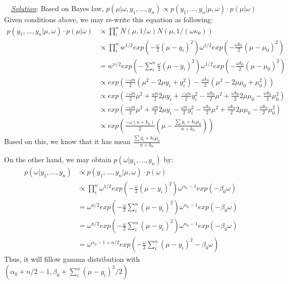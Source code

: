 \documentclass[twoside]{article}
\newenvironment{solution}{
  \begin{flushleft} \noindent ~~\underline{\emph{Solution}}: \rmfamily}{\end{flushleft}}
\begin{document}
\begin{solution}
Based on Bayes law, $p(\mu |\omega, y_1,\dots, y_n) \propto p(y_1, \dots, y_n| \mu, \omega) \cdot p(\mu| \omega)  $ Given conditions above, we may re-write this equation as following:
\begin{equation}
\begin{split}
p(y_1, \dots, y_n| \mu, \omega) \cdot p(\mu| \omega) &\propto \prod_i^n N(\mu, 1/\omega) N(\mu, 1/(\omega \kappa_0))
\\ &\propto \prod_i^nw^{1/2}exp(-\frac{\omega}{2}(\mu-y_i)^2) \omega^{1/2}exp(-\frac{\omega k_0}{2}(\mu-\mu_0)^2)
\\ &= w^{n/2}exp(-\sum_i^n\frac{\omega}{2}(\mu-y_i)^2) \omega^{1/2} exp(-\frac{\omega k_0}{2}(\mu-\mu_0)^2) 
\\ & \propto exp(\frac{-\omega n}{2}(\mu^2 - 2\mu y_i + y_i^2) -\frac{\omega k_0}{2}(\mu^2-2\mu\mu_0+\mu_0^2))
\\ & \propto exp(\frac{-\omega n}{2}\mu^2 + \frac{\omega n}{2}2\mu y_i + \frac{-\omega n}{2}y_i^2 -\frac{\omega k_0}{2}\mu^2+\frac{\omega k_0}{2}2\mu\mu_0-\frac{\omega k_0}{2}\mu_0^2)
\\ & \propto exp(\frac{-\omega n}{2}\mu^2 + \frac{\omega n}{2}2\mu y_i - \frac{\omega n}{2}y_i^2 -\frac{\omega k_0}{2}\mu^2+\frac{\omega k_0}{2}2\mu\mu_0-\frac{\omega k_0}{2}\mu_0^2)
\\ & \propto exp(\frac{-\omega(n +k_0)}{2}(\mu-\frac{\sum y_i + k_0\mu_0}{n+k_0}))
\end{split}
\end{equation}
Based on this, we know that it has mean $\frac{\sum y_i + k_0\mu_0}{n+k_0}$
\par
On the other hand, we may obtain $p(\omega|y_1,\dots,y_n)$ by:
\begin{equation}
\begin{split}
p(\omega|y_1,\dots,y_n) & \propto p(y_1, \dots, y_n|\mu, \omega) \cdot p(\omega)
\\ & \propto \prod_i^n\omega^{1/2}exp(-\frac{\omega}{2}(\mu-y_i)^2) \omega^{\alpha_0-1}exp(-\beta_0\omega) 
\\ &= \omega^{n/2}exp(-\frac{\omega}{2} \sum_i^n(\mu-y_i)^2) \omega^{\alpha_0-1}exp(-\beta_0\omega) 
\\ &= \omega^{n/2}exp(-\frac{\omega}{2} \sum_i^n(\mu-y_i)^2) \omega^{\alpha_0-1}exp(-\beta_0\omega) 
\\ &= \omega^{\alpha_0-1+n/2}exp(-\frac{\omega}{2} \sum_i^n(\mu-y_i)^2 -\beta_0\omega) 
\end{split}
\end{equation}
Thus, it will fillow gamma distribution with $(\alpha_0+n/2-1, \beta_0+\sum_i^n(\mu-y_i)^2/2)$
\end{solution}
\end{document}
